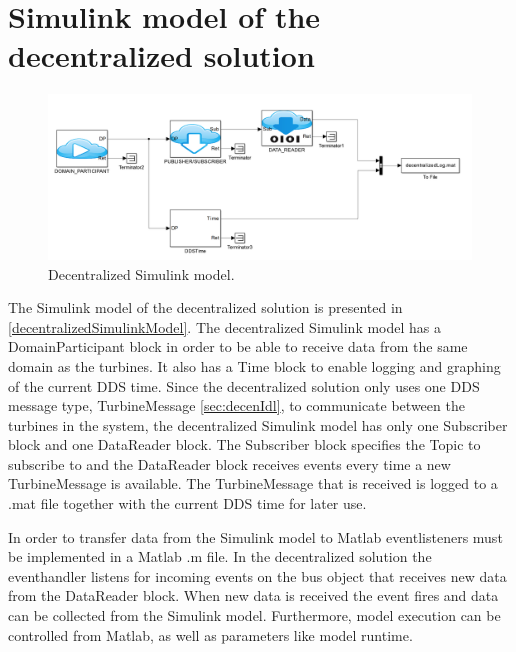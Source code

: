 \section{Simulink model of the decentralized solution}\label{subsec:decentralizedmodel}

\begin{figure}[!h]
\includegraphics[width=\textwidth]{figures/DecentralizedModel}
	\caption[Decentralized Simulink model]{
		\label{fig:decentralizedSimulinkModel} 
		\footnotesize{%
			Decentralized Simulink model.
		}
	}
\end{figure}

The Simulink model of the decentralized solution is presented in \cref{decentralizedSimulinkModel}. The decentralized Simulink model has a DomainParticipant block in order to be able to receive data from the same domain as the turbines. It also has a Time block to enable logging and graphing of the current DDS time. Since the decentralized solution only uses one DDS message type, TurbineMessage \cref{sec:decenIdl}, to communicate between the turbines in the system, the decentralized Simulink model has only one Subscriber block and one DataReader block. The Subscriber block specifies the Topic to subscribe to and the DataReader block receives events every time a new TurbineMessage is available. The TurbineMessage that is received is logged to a .mat file together with the current DDS time for later use.

In order to transfer data from the Simulink model to Matlab eventlisteners must be implemented in a Matlab .m file. In the decentralized solution the eventhandler listens for incoming events on the bus object that receives new data from the DataReader block. When new data is received the event fires and data can be collected from the Simulink model. Furthermore, model execution can be controlled from Matlab, as well as parameters like model runtime.


